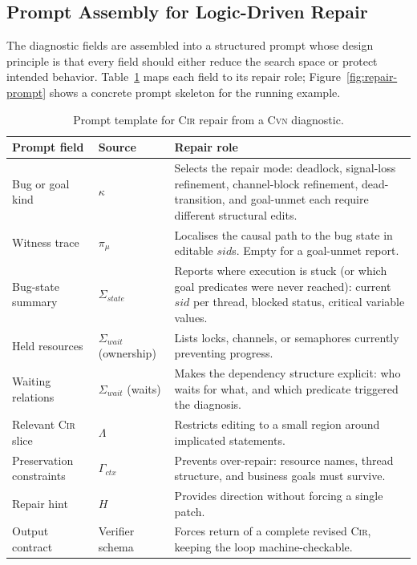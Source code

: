 \subsection{Prompt Assembly for Logic-Driven Repair}
\label{subsec:repair-templates}

The diagnostic fields are assembled into a structured prompt whose
design principle is that every field should either reduce the search
space or protect intended behavior. Table~\ref{tab:repair-templates}
maps each field to its repair role; Figure~\ref{fig:repair-prompt}
shows a concrete prompt skeleton for the running example.

\begin{table}[t]
\caption{Prompt template for \textsc{Cir} repair from a
  \textsc{Cvn} diagnostic.}
\label{tab:repair-templates}
\centering\small
\begin{tabular}{@{}p{3.0cm}p{4.2cm}p{7.7cm}@{}}
\toprule
\textbf{Prompt field}
  & \textbf{Source}
  & \textbf{Repair role} \\
\midrule
Bug or goal kind
  & $\kappa$
  & Selects the repair mode: deadlock, signal-loss refinement,
    channel-block refinement, dead-transition, and goal-unmet each
    require different structural edits. \\
\addlinespace[3pt]
Witness trace
  & $\pi_{\mu}$
  & Localises the causal path to the bug state in editable $\mathit{sid}$s. Empty for a goal-unmet report. \\
\addlinespace[3pt]
Bug-state summary
  & $\Sigma_{\mathit{state}}$
  & Reports where execution is stuck (or which goal predicates were never reached): current $\mathit{sid}$ per thread, blocked status, critical variable values. \\
\addlinespace[3pt]
Held resources
  & $\Sigma_{\mathit{wait}}$ (ownership)
  & Lists locks, channels, or semaphores currently preventing progress. \\
\addlinespace[3pt]
Waiting relations
  & $\Sigma_{\mathit{wait}}$ (waits)
  & Makes the dependency structure explicit: who waits for what, and which predicate triggered the diagnosis. \\
\addlinespace[3pt]
Relevant \textsc{Cir} slice
  & $\Lambda$
  & Restricts editing to a small region around implicated statements. \\
\addlinespace[3pt]
Preservation constraints
  & $\Gamma_{\mathit{ctx}}$
  & Prevents over-repair: resource names, thread structure, and business goals must survive. \\
\addlinespace[3pt]
Repair hint
  & $H$
  & Provides direction without forcing a single patch. \\
\addlinespace[3pt]
Output contract
  & Verifier schema
  & Forces return of a complete revised \textsc{Cir}, keeping the loop machine-checkable. \\
\bottomrule
\end{tabular}
\end{table}

